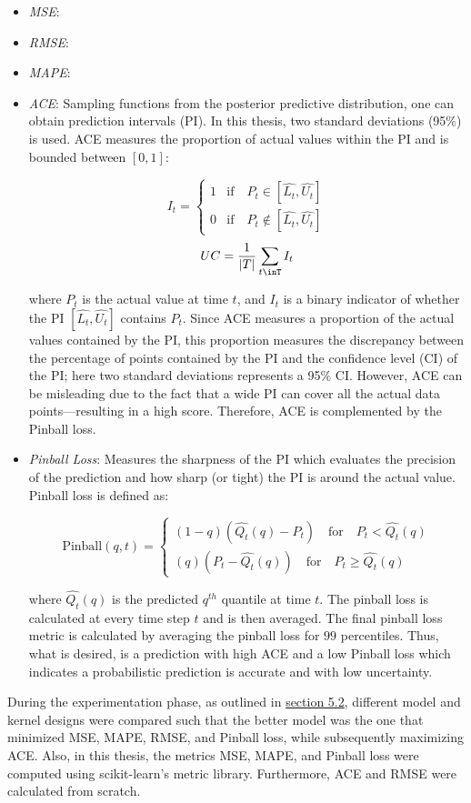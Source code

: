 \begin{itemize}
    \item \textit{MSE}: 
    \item \textit{RMSE}:
    \item \textit{MAPE}:
    \item \textit{ACE}: Sampling functions from the posterior predictive distribution, one can obtain prediction intervals (PI). In this thesis, two standard deviations (95\%) is used. ACE measures the proportion of actual values within the PI and is bounded between $[0, 1]$:
    
    $$ I_t = 
    \begin{cases}
      1 & \text{if} \quad P_t \in [\hat{L_t}, \hat{U_t}] \\
      0 & \text{if} \quad P_t \notin [\hat{L_t}, \hat{U_t}]
    \end{cases}
    $$
    $$UC = \frac{1}{|T|}\sum_{t\inT}I_t$$
    
    where $P_t$ is the actual value at time $t$, and $I_t$ is a binary indicator of whether the PI $ [\hat{L_t}, \hat{U_t}]$ contains $P_t$. Since ACE measures a proportion of the actual values contained by the PI, this proportion measures the discrepancy between the percentage of points contained by the PI and the confidence level (CI) of the PI; here two standard deviations represents a 95\% CI. However, ACE can be misleading due to the fact that a wide PI can cover all the actual data points—resulting in a high score. Therefore, ACE is complemented by the Pinball loss.
    
    \item \textit{Pinball Loss}: Measures the sharpness of the PI which evaluates the precision of the prediction and how sharp (or tight) the PI is around the actual value. Pinball loss is defined as:
    
    $$ \text{Pinball}(q, t) = 
    \begin{cases}
    (1 - q)(\hat{Q_t}(q) - P_t) \quad \text{for} \quad P_t < \hat{Q_t}(q) \\
    (q)(P_t - \hat{Q_t}(q)) \quad \text{for} \quad P_t \ge \hat{Q_t}(q) 
    \end{cases}
    $$
    
    where $\hat{Q_t}(q)$ is the predicted $q^{th}$ quantile at time $t$. The pinball loss is calculated at every time step $t$ and is then averaged. The final pinball loss metric is calculated by averaging the pinball loss for $99$ percentiles. Thus, what is desired, is a prediction with high ACE and a low Pinball loss which indicates a probabilistic prediction is accurate and with low uncertainty.
    
\end{itemize}

During the experimentation phase, as outlined in \hyperlink{section.5.2}{section 5.2}, different model and kernel designs were compared such that the better model was the one that minimized MSE, MAPE, RMSE, and Pinball loss, while subsequently maximizing ACE. Also, in this thesis, the metrics MSE, MAPE, and Pinball loss were computed using scikit-learn's metric library. Furthermore, ACE and RMSE were calculated from scratch. 



